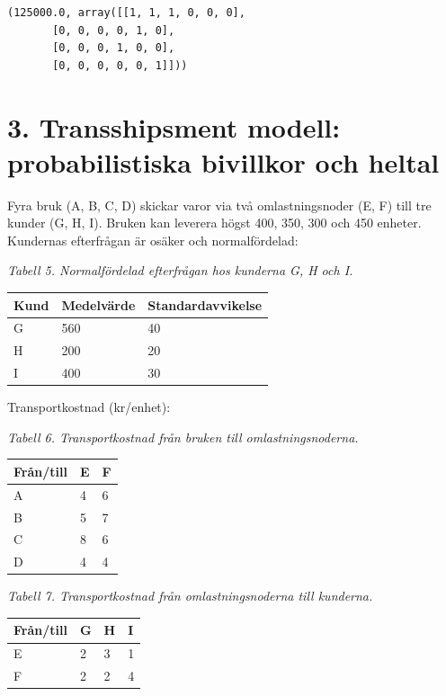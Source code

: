 \documentclass[11pt]{article}
\begin{document}
    \begin{Verbatim}[commandchars=\\\{\}]
(125000.0, array([[1, 1, 1, 0, 0, 0],
       [0, 0, 0, 0, 1, 0],
       [0, 0, 0, 1, 0, 0],
       [0, 0, 0, 0, 0, 1]]))
    \end{Verbatim}

    \section{3. Transshipsment modell: probabilistiska bivillkor och
heltal}\label{transshipsment-modell-probabilistiska-bivillkor-och-heltal}

Fyra bruk (A, B, C, D) skickar varor via två omlastningsnoder (E, F)
till tre kunder (G, H, I). Bruken kan leverera högst 400, 350, 300 och
450 enheter. Kundernas efterfrågan är osäker och normalfördelad:

\emph{Tabell 5. Normalfördelad efterfrågan hos kunderna G, H och I.}

{\def\LTcaptype{none} %
\begin{longtable}[]{@{}lll@{}}
\toprule\noalign{}
Kund & Medelvärde & Standardavvikelse \\
\midrule\noalign{}
\endhead
\bottomrule\noalign{}
\endlastfoot
G & 560 & 40 \\
H & 200 & 20 \\
I & 400 & 30 \\
\end{longtable}
}

Transportkostnad (kr/enhet):

\emph{Tabell 6. Transportkostnad från bruken till omlastningsnoderna.}

{\def\LTcaptype{none} %
\begin{longtable}[]{@{}lll@{}}
\toprule\noalign{}
Från/till & E & F \\
\midrule\noalign{}
\endhead
\bottomrule\noalign{}
\endlastfoot
A & 4 & 6 \\
B & 5 & 7 \\
C & 8 & 6 \\
D & 4 & 4 \\
\end{longtable}
}

\emph{Tabell 7. Transportkostnad från omlastningsnoderna till kunderna.}

{\def\LTcaptype{none} %
\begin{longtable}[]{@{}llll@{}}
\toprule\noalign{}
Från/till & G & H & I \\
\midrule\noalign{}
\endhead
\bottomrule\noalign{}
\endlastfoot
E & 2 & 3 & 1 \\
F & 2 & 2 & 4 \\
\end{longtable}
}
\end{document}
